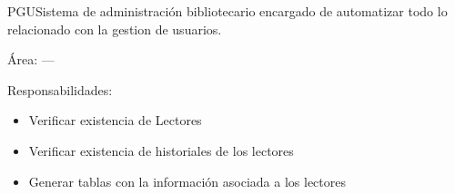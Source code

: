 \begin{Actor}{PGU}{Sistema de administración bibliotecario encargado de automatizar todo lo relacionado con la gestion de usuarios.}
	\item[Área:] ---
	\item[Responsabilidades:] \hspace{1pt}
	\begin{itemize}
		\item Verificar existencia de Lectores
		\item Verificar existencia de historiales de los lectores
		\item Generar tablas con la información asociada a los lectores
			\end{itemize}
\end{Actor}



